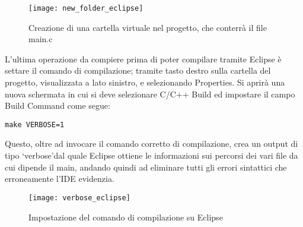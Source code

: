 \begin{figure}[H]
\texttt{[image: new\_folder\_eclipse]}
\centering
\caption{Creazione di una cartella virtuale nel progetto, che conterrà il file main.c}
\label{makefile_proj}
\end{figure}

L'ultima operazione da compiere prima di poter compilare tramite Eclipse è settare il comando di compilazione; tramite tasto destro sulla cartella del progetto, visualizzata a lato sinistro, e selezionando Properties. Si aprirà una nuova schermata in cui si deve selezionare C/C++ Build ed impostare il campo Build Command come segue: 

\begin{verbatim}
make VERBOSE=1
\end{verbatim}
Questo, oltre ad invocare il comando corretto di compilazione, crea un output di tipo \lq verbose\rq dal quale Eclipse ottiene le informazioni sui percorsi dei vari file da cui dipende il main, andando quindi ad eliminare tutti gli errori sintattici che erroneamente l'IDE evidenzia.

\begin{figure}[H]
\texttt{[image: verbose\_eclipse]}
\centering
\caption{Impostazione del comando di compilazione su Eclipse}
\end{figure}

